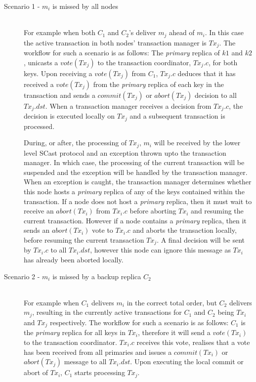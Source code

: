     \begin{description}
         \item[Scenario 1 - $m_i$ is missed by all nodes] \hfill \\
         For example when both $C_1$ and $C_2$'s deliver $m_j$ ahead of $m_i$.  In this case the active transaction in both nodes' transaction manager is $Tx_j$.  The workflow for such a scenario is as follows: The \emph{primary} replica of $k1$ and $k2$, unicasts a $vote(Tx_j)$ to the transaction coordinator, $Tx_j.c$, for both keys.  Upon receiving a $vote(Tx_j)$ from $C_1$, $Tx_j.c$ deduces that it has received a $vote(Tx_j)$ from the \emph{primary} replica of each key in the transaction and sends a $commit(Tx_j)$ or $abort(Tx_j)$ decision to all $Tx_j.dst$.   When a transaction manager receives a decision from $Tx_j.c$, the decision is executed locally on $Tx_j$ and a subsequent transaction is processed.  
         
         During, or after, the processing of $Tx_j$, $m_i$ will be received by the lower level \textsf{SCast} protocol and an exception thrown upto the transaction manager.  In which case, the processing of the current transaction will be suspended and the exception will be handled by the transaction manager.  When an exception is caught, the transaction manager determines whether this node hosts a \emph{primary} replica of any of the keys contained within the transaction.  If a node does not host a \emph{primary} replica, then it must wait to receive an $abort(Tx_i)$ from $Tx_i.c$ before aborting $Tx_i$ and resuming the current transaction.  However if a node contains a \emph{primary} replica, then it sends an $abort(Tx_i)$ vote to $Tx_i.c$ and aborts the transaction locally, before resuming the current transaction $Tx_j$.  A final decision will be sent by $Tx_i.c$ to all $Tx_i.dst$, however this node can ignore this message as $Tx_i$ has already been aborted locally. 
         

         \item[Scenario 2 - $m_i$ is missed by a backup replica $C_2$] \hfill \\
         For example when $C_1$ delivers $m_i$ in the correct total order, but $C_2$ delivers $m_j$, resulting in the currently active transactions for $C_1$ and $C_2$ being $Tx_i$ and $Tx_j$ respectively.  The workflow for such a scenario is as follows: $C_1$ is the \emph{primary} replica for all keys in $Tx_i$, therefore it will send a $vote(Tx_i)$ to the transaction coordinator.  $Tx_i.c$ receives this vote, realises that a vote has been received from all primaries and issues a $commit(Tx_i)$ or $abort(Tx_j)$ message to all $Tx_i.dst$.  Upon executing the local commit or abort of $Tx_i$, $C_1$ starts processing $Tx_j$.  
         

\end{description}

